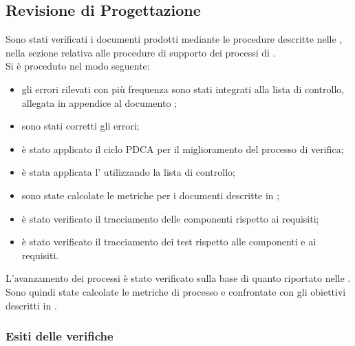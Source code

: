 \subsection{Revisione di Progettazione}
Sono stati verificati i documenti prodotti mediante le procedure descritte nelle \NormeDiProgetto{}, nella sezione relativa alle procedure di supporto dei processi di \VV{}.\\
Si è proceduto nel modo seguente:\begin{itemize}
	\item gli errori rilevati con più frequenza sono stati integrati alla lista di controllo, allegata in appendice al documento \NormeDiProgetto{};
	\item sono stati corretti gli errori;
	\item è stato applicato il ciclo PDCA per il miglioramento del processo di verifica;
	\item è stata applicata l' utilizzando la lista di controllo;
	\item sono state calcolate le metriche per i documenti descritte in \NormeDiProgetto{};
	\item è stato verificato il tracciamento delle componenti rispetto ai requisiti;
	\item è stato verificato il tracciamento dei test rispetto alle componenti e ai requisiti.
\end{itemize}
L'avanzamento dei processi è stato verificato sulla base di quanto riportato nelle \NormeDiProgetto{}. Sono quindi state calcolate le metriche di processo e confrontate con gli obiettivi descritti in .

\subsubsection{Esiti delle verifiche}
